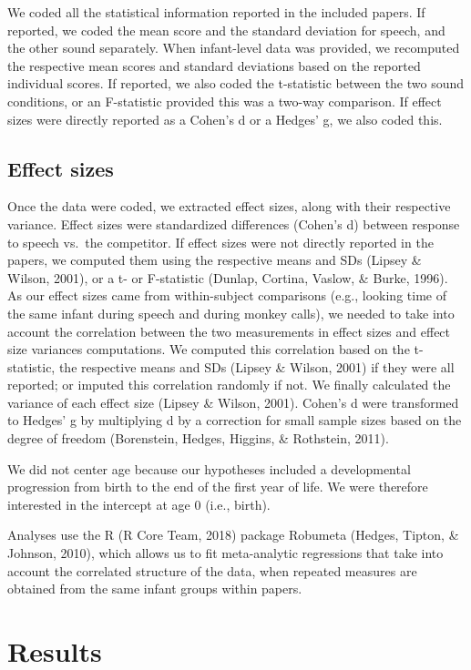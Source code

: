 \documentclass[man]{apa6}
\begin{document}
We coded all the statistical information reported in the included papers. If reported, we coded the mean score and the standard deviation for speech, and the other sound separately. When infant-level data was provided, we recomputed the respective mean scores and standard deviations based on the reported individual scores. If reported, we also coded the t-statistic between the two sound conditions, or an F-statistic provided this was a two-way comparison. If effect sizes were directly reported as a Cohen's d or a Hedges' g, we also coded this.

\hypertarget{effect-sizes}{%
\subsection{Effect sizes}\label{effect-sizes}}

Once the data were coded, we extracted effect sizes, along with their respective variance. Effect sizes were standardized differences (Cohen's d) between response to speech vs.~the competitor.
If effect sizes were not directly reported in the papers, we computed them using the respective means and SDs (Lipsey \& Wilson, 2001), or a t- or F-statistic (Dunlap, Cortina, Vaslow, \& Burke, 1996). As our effect sizes came from within-subject comparisons (e.g., looking time of the same infant during speech and during monkey calls), we needed to take into account the correlation between the two measurements in effect sizes and effect size variances computations. We computed this correlation based on the t-statistic, the respective means and SDs (Lipsey \& Wilson, 2001) if they were all reported; or imputed this correlation randomly if not. We finally calculated the variance of each effect size (Lipsey \& Wilson, 2001). Cohen's d were transformed to Hedges' g by multiplying d by a correction for small sample sizes based on the degree of freedom (Borenstein, Hedges, Higgins, \& Rothstein, 2011).

We did not center age because our hypotheses included a developmental progression from birth to the end of the first year of life. We were therefore interested in the intercept at age 0 (i.e., birth).

Analyses use the R (R Core Team, 2018) package Robumeta (Hedges, Tipton, \& Johnson, 2010), which allows us to fit meta-analytic regressions that take into account the correlated structure of the data, when repeated measures are obtained from the same infant groups within papers.

\hypertarget{results}{%
\section{Results}\label{results}}
\end{document}
